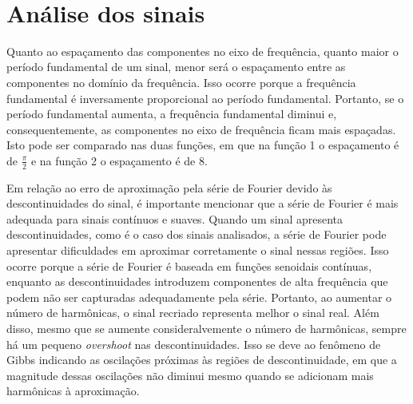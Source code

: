 \documentclass{article}
\begin{document}
    \begin{center}
    \end{center}
    { \hspace*{\fill} \\}
    
    \hypertarget{anuxe1lise-dos-sinais}{%
\section{Análise dos sinais}\label{anuxe1lise-dos-sinais}}

Quanto ao espaçamento das componentes no eixo de frequência, quanto
maior o período fundamental de um sinal, menor será o espaçamento entre
as componentes no domínio da frequência. Isso ocorre porque a frequência
fundamental é inversamente proporcional ao período fundamental.
Portanto, se o período fundamental aumenta, a frequência fundamental
diminui e, consequentemente, as componentes no eixo de frequência ficam
mais espaçadas. Isto pode ser comparado nas duas funções, em que na
função 1 o espaçamento é de \(\frac{\pi}{2}\) e na função 2 o
espaçamento é de 8.

Em relação ao erro de aproximação pela série de Fourier devido às
descontinuidades do sinal, é importante mencionar que a série de Fourier
é mais adequada para sinais contínuos e suaves. Quando um sinal
apresenta descontinuidades, como é o caso dos sinais analisados, a série
de Fourier pode apresentar dificuldades em aproximar corretamente o
sinal nessas regiões. Isso ocorre porque a série de Fourier é baseada em
funções senoidais contínuas, enquanto as descontinuidades introduzem
componentes de alta frequência que podem não ser capturadas
adequadamente pela série. Portanto, ao aumentar o número de harmônicas,
o sinal recriado representa melhor o sinal real. Além disso, mesmo que
se aumente consideralvemente o número de harmônicas, sempre há um
pequeno \emph{overshoot} nas descontinuidades. Isso se deve ao fenômeno
de Gibbs indicando as oscilações próximas às regiões de descontinuidade,
em que a magnitude dessas oscilações não diminui mesmo quando se
adicionam mais harmônicas à aproximação.


    
    
    
\end{document}
